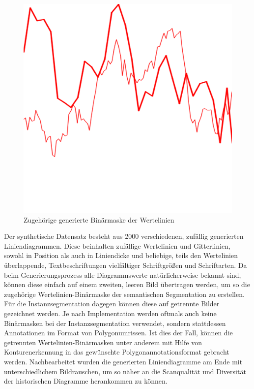 \begin{figure}[H]
\begin{minipage}{0.475\textwidth}
        \includegraphics[width=\linewidth]{Methodik/img/lines_synthetic_mask.png}
        \caption{ Zugehörige generierte Binärmaske der Wertelinien}
        \label{fig:lines_synthetic_mask}
    \end{minipage}
\end{figure}

Der synthetische Datensatz besteht aus 2000 verschiedenen, zufällig generierten Liniendiagrammen. Diese beinhalten zufällige Wertelinien und Gitterlinien, sowohl in Position als auch in Liniendicke und beliebige, teils den Wertelinien überlappende, Textbeschriftungen vielfältiger Schriftgrößen und Schriftarten. Da beim Generierungsprozess alle Diagrammswerte natürlicherweise bekannt sind, können diese einfach auf einem zweiten, leeren Bild übertragen werden, um so die zugehörige Wertelinien-Binärmaske der semantischen Segmentation zu erstellen. Für die Instanzsegmentation dagegen können diese auf getrennte Bilder gezeichnet werden. Je nach Implementation werden oftmals auch keine Binärmasken bei der Instanzsegmentation verwendet, sondern stattdessen Annotationen im Format von Polygonumrissen. Ist dies der Fall, können die getrennten Wertelinien-Binärmasken unter anderem mit Hilfe von Konturenerkennung in das gewünschte Polygonannotationsformat gebracht werden. Nachbearbeitet wurden die generierten Liniendiagramme am Ende mit unterschiedlichem Bildrauschen, um so näher an die Scanqualität und Diversität der historischen Diagramme herankommen zu können.


